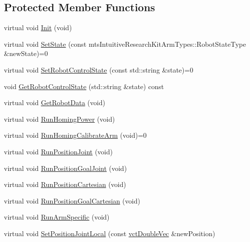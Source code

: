 \subsection*{Protected Member Functions}
\begin{DoxyCompactItemize}
\item 
virtual void \hyperlink{classmts_intuitive_research_kit_arm_a0ca9419383cc357218f1ab25b9da5405}{Init} (void)
\item 
virtual void \hyperlink{classmts_intuitive_research_kit_arm_a71ac45020e7a77ce3892e4dc312adec3}{Set\+State} (const mts\+Intuitive\+Research\+Kit\+Arm\+Types\+::\+Robot\+State\+Type \&new\+State)=0
\item 
virtual void \hyperlink{classmts_intuitive_research_kit_arm_ae2e2808687bca1fcd58d6a3495d9820d}{Set\+Robot\+Control\+State} (const std\+::string \&state)=0
\item 
void \hyperlink{classmts_intuitive_research_kit_arm_aec0a1efd9c248846c9c2b61373ac8156}{Get\+Robot\+Control\+State} (std\+::string \&state) const 
\item 
virtual void \hyperlink{classmts_intuitive_research_kit_arm_ae8385abbcb7164a7232a70f8f90230ad}{Get\+Robot\+Data} (void)
\item 
virtual void \hyperlink{classmts_intuitive_research_kit_arm_ab18b06b059aee25f6671ae33a4d9cbeb}{Run\+Homing\+Power} (void)
\item 
virtual void \hyperlink{classmts_intuitive_research_kit_arm_ab61f28ceeede413541382e49ae092600}{Run\+Homing\+Calibrate\+Arm} (void)=0
\item 
virtual void \hyperlink{classmts_intuitive_research_kit_arm_a47b6d6b34097d8d3b9a2b701ebf7fd64}{Run\+Position\+Joint} (void)
\item 
virtual void \hyperlink{classmts_intuitive_research_kit_arm_a786351a40b8b92f120d25253496f918d}{Run\+Position\+Goal\+Joint} (void)
\item 
virtual void \hyperlink{classmts_intuitive_research_kit_arm_a2cef8afff57646cafccdb804d02dc88c}{Run\+Position\+Cartesian} (void)
\item 
virtual void \hyperlink{classmts_intuitive_research_kit_arm_af144fbdcfb8d1d4090a805d7ba2fbb83}{Run\+Position\+Goal\+Cartesian} (void)
\item 
virtual void \hyperlink{classmts_intuitive_research_kit_arm_a178322f557694c5f9363047f84560504}{Run\+Arm\+Specific} (void)
\item 
virtual void \hyperlink{classmts_intuitive_research_kit_arm_a5064bc188dcba4345248689f0770b479}{Set\+Position\+Joint\+Local} (const \hyperlink{vct_dynamic_vector_types_8h_ade4b3068c86fb88f41af2e5187e491c2}{vct\+Double\+Vec} \&new\+Position)

\end{DoxyCompactItemize}
